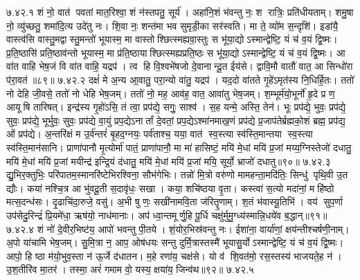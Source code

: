 ७.४२.१
शं नो॒ वात॑ पवतां मात॒रिश्वा॒ शं न॑स्तपतु॒ सूर्य॑। अहा॑नि॒शं भ॑वन्तु नः॒ श रात्रिः॒ प्रति॑धीयताम्। शमु॒षा नो॒ व्यु॑च्छतु॒ शमा॑दि॒त्य उदे॑तु नः। शि॒वा नः॒ शन्त॑मा भव सुमृडी॒का सर॑स्वति। मा ते॒ व्यो॑म स॒न्दृशि॑। इडा॑यै॒ वास्त्व॑सि वास्तु॒मद्वास्तु॒मन्तो॑ भूयास्म॒ मा वास्तोश्छित्स्मह्यवा॒स्तुः स भू॑या॒द्योऽस्मान्द्वेष्टि॒ यं च॑ व॒यं द्वि॒ष्मः। प्र॒ति॒ष्ठासि॑ प्रति॒ष्ठाव॑न्तो भूयास्म॒ मा प्र॑ति॒ष्ठायाश्छित्स्मह्यप्रति॒ष्ठः स भू॑या॒द्योऽस्मान्द्वेष्टि॒ यं च॑ व॒यं द्वि॒ष्मः। आ वा॑त वाहि भेष॒जं वि वा॑त वाहि॒ यद्रप॑। त्व हि वि॒श्वभे॑षजो दे॒वानान्दू॒त ईय॑से। द्वावि॒मौ वातौ॑ वात॒ आ सिन्धो॑रा प॑रा॒वत॑॥८९॥
७.४२.२
दक्षं॑ मे अ॒न्य आ॒वातु॒ परा॒न्यो वा॑तु॒ यद्रप॑। यद॒दो वा॑तते गृ॒हे॑ऽमृत॑स्य नि॒धिर्\mbox{}हि॒तः। ततो॑ नो देहि जी॒वसे॒ ततो॑ नो धेहि भेष॒जम्। ततो॑ नो॒ मह॒ आव॑ह॒ वात॒ आवा॑तु भेष॒जम्। श॒म्भूर्म॑यो॒भूर्नो॑ हृ॒दे प्र ण॒ आयूषि तारिषत्। इन्द्र॑स्य गृ॒हो॑ऽसि॒ तं त्वा॒ प्रप॑द्ये॒ सगुः॒ साश्व॑। स॒ह यन्मे॒ अस्ति॒ तेन॑। भूः प्रप॑द्ये॒ भुवः॒ प्रप॑द्ये॒ सुवः॒ प्रप॑द्ये॒ भूर्भुवः॒ सुवः॒ प्रप॑द्ये वा॒युं प्रप॒द्येऽनार्तां दे॒वतां॒ प्रप॒द्येऽश्मा॑नमाख॒णं प्रप॑द्ये प्र॒जाप॑तेर्ब्रह्मको॒शं ब्रह्म॒ प्रप॑द्य॒ ओं प्रप॑द्ये। अ॒न्तरि॑क्षं म उ॒र्व॑न्तरं॑ बृ॒हद॒ग्नयः॒ पर्व॑ताश्च॒ यया॒ वात॑ स्व॒स्त्या स्व॑स्ति॒मान्तया स्व॒स्त्या स्व॑स्ति॒मान॑सानि। प्राणा॑पानौ मृ॒त्योर्मा॑ पातं॒ प्राणा॑पानौ॒ मा मा॑ हासिष्टं॒ मयि॑ मे॒धां मयि॑ प्र॒जां मय्य॒ग्निस्तेजो॑ दधातु॒ मयि॑ मे॒धां मयि॑ प्र॒जां मयीन्द्र॑ इन्द्रि॒यं द॑धातु॒ मयि॑ मे॒धां मयि॑ प्र॒जां मयि॒ सूर्यो॒ भ्राजो॑ दधातु॥९०॥
७.४२.३
द्यु॒भिर॒क्तुभिः॒ परि॑पातम॒स्मानरि॑ष्टेभिरश्विना॒ सौभ॑गेभिः। तन्नो॑ मि॒त्रो वरु॑णो मामहन्ता॒मदि॑तिः॒ सिन्धु॑ पृथि॒वी उ॒त द्यौः। कया॑ नश्चि॒त्र आ भु॑वदू॒ती स॒दावृ॑धः॒ सखा। कया॒ शचि॑ष्ठया वृ॒ता। कस्त्वा॑ स॒त्यो मदा॑नां॒ महि॑ष्ठो मत्स॒दन्ध॑सः। दृ॒ढाचि॑दा॒रुजे॒ वसु॑। अ॒भी षु णः॒ सखी॑नामवि॒ता ज॑रितॄ॒णाम्। श॒तं भ॑वास्यू॒तिभि॑। वय॑ सुप॒र्णा उप॑सेदु॒रिन्द्रं॑ प्रि॒यमे॑धा॒ ऋष॑यो॒ नाध॑मानाः। अप॑ ध्वा॒न्तमूर्णु॒हि पू॒र्धि चक्षु॑र्मुमु॒ग्ध्य॑स्मान्नि॒धये॑व ब॒द्धान्॥९१॥
७.४२.४
शं नो॑ दे॒वीर॒भिष्ट॑य॒ आपो॑ भवन्तु पी॒तये। शं॒योर॒भिस्र॑वन्तु नः। ईशा॑ना॒ वार्या॑णां॒ क्षय॑न्तीश्चर्\mbox{}षणी॒नाम्। अ॒पो या॑चामि भेष॒जम्। सु॒मि॒त्रा न॒ आप॒ ओष॑धयः सन्तु दुर्मि॒त्रास्तस्मै॑ भूयासु॒र्योऽस्मान्द्वेष्टि॒ यं च॑ व॒यं द्वि॒ष्मः। आपो॒ हि ष्ठा म॑यो॒भुव॒स्ता न॑ ऊ॒र्जे द॑धातन। म॒हे रणा॑य॒ चक्ष॑से। यो व॑ शि॒वत॑मो॒ रस॒स्तस्य॑ भाजयते॒ह न॑। उ॒श॒तीरि॑व मा॒तर॑। तस्मा॒ अरं॑ गमाम वो॒ यस्य॒ क्षया॑य॒ जिन्व॑थ॥९२॥
७.४२.५
